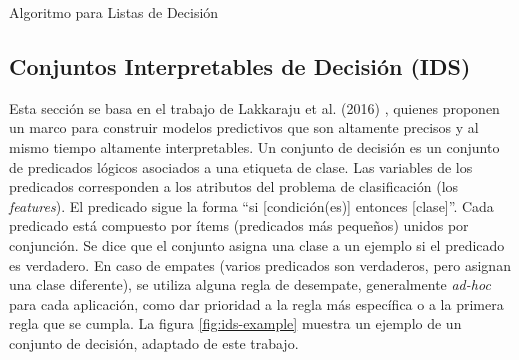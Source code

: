 \begin{algorithm}[H]
\caption{Algoritmo para Listas de Decisión}

\end{algorithm}

\subsection{Conjuntos Interpretables de Decisión (IDS)}

Esta sección se basa en el trabajo de Lakkaraju et al. (2016) \cite{lakkaraju-2016}, quienes proponen un marco para construir modelos predictivos que son altamente precisos y al mismo tiempo altamente interpretables. Un conjunto de decisión es un conjunto de predicados lógicos asociados a una etiqueta de clase. Las variables de los predicados corresponden a los atributos del problema de clasificación (los \emph{features}). El predicado sigue la forma “si [condición(es)] entonces [clase]”. Cada predicado está compuesto por ítems (predicados más pequeños) unidos por conjunción. Se dice que el conjunto asigna una clase a un ejemplo si el predicado es verdadero. En caso de empates (varios predicados son verdaderos, pero asignan una clase diferente), se utiliza alguna regla de desempate, generalmente \emph{ad-hoc} para cada aplicación, como dar prioridad a la regla más específica o a la primera regla que se cumpla. La figura \ref{fig:ids-example} muestra un ejemplo de un conjunto de decisión, adaptado de este trabajo. 










